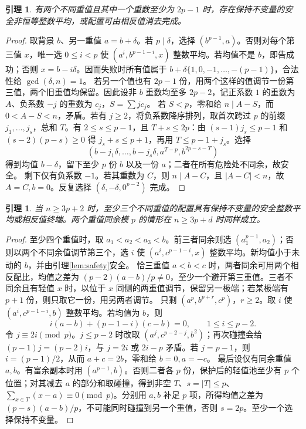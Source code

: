 \documentclass[11pt,a4paper]{article}
\newtheorem{lemma}[theorem]{引理}
\theoremstyle{definition}
\numberwithin{equation}{section}
\begin{document}
\begin{lemma}\label{lem:background}
有两个不同重值且其中一个重数至少为 $2p-1$ 时，存在保持不变量的安全非恒等整数平均，或配置可由相反值消去完成。
\end{lemma}
\begin{proof}
取背景 $b$、另一重值 $a=b+\delta$。若 $p\mid\delta$，选择 $(b^{p-1},a)$。否则对每个第三值 $x$，唯一选 $0\le i<p$ 使 $(a^i,b^{p-1-i},x)$ 整数平均。若均值不是 $b$，即告成功；否则 $x=b-i\delta$。因而失败时所有值属于 $b+\delta\{1,0,-1,\ldots,-(p-1)\}$，合法性给 $\gcd(\delta,n)=1$。
若另一个值也有 $2p-1$ 份，用两个这样的值调节一份第三值，两个旧重值均保留。因此设非 $b$ 重数均至多 $2p-2$，记正系数 $1$ 的重数为 $A$、负系数 $-j$ 的重数为 $c_j$，$S=\sum j c_j$。
若 $S<p$，零和给 $n\mid A-S$，而 $0<A-S<n$，矛盾。若有 $j\ge2$，将负系数降序排列，取首次跨过 $p$ 的前缀 $j_1,\ldots,j_s$，总和 $T$。有 $2\le s\le p-1$，且 $T+s\le2p$：由 $(s-1)j_s\le p-1$ 和 $(s-2)(p-s)\ge0$ 得 $j_s+s\le p+1$，再用 $T\le p-1+j_s$。选择
\[(b-j_1\delta,\ldots,b-j_s\delta,a^{T-p},b^{2p-s-T})
\]
得到均值 $b-\delta$，留下至少 $p$ 份 $b$ 以及一份 $a$；二者在所有危险处不同余，故安全。
剩下仅有负系数 $-1$。若其重数为 $C$，则 $n\mid A-C$，且 $|A-C|<n$，故 $A=C,b=0$。反复选择 $(\delta,-\delta,0^{p-2})$ 完成。
\end{proof}

\begin{lemma}\label{lem:heavy}
当 $n\ge3p+2$ 时，至少三个不同重值的配置具有保持不变量的安全整数平均或相反值终端。两个重值同余模 $p$ 的情形在 $n\ge3p+d$ 时同样成立。
\end{lemma}
\begin{proof}
至少四个重值时，取 $a_1<a_2<a_3<b$。前三者同余则选 $(a_1^{p-1},a_2)$；否则以两个不同余值调节第三个，选 $i$ 使 $(a^i,c^{p-1-i},x)$ 整数平均。新均值小于未动的 $b$，并由引理\ref{lem:safety}安全。
恰三重值 $a<b<c$ 时，两者同余可用两个相反配比，均值之差为 $(p-2)(a-b)/p\ne0$，至少一个避开第三重值。三者不同余且有轻值 $x$ 时，以位于 $x$ 同侧的两重值调节，保留另一极端；若某极端有 $p+1$ 份，则只取它一份，用另两者调节。
只剩 $(a^p,b^{p+r},c^p)$，$r\ge2$。取 $i$ 使 $(a^i,c^{p-1-i},b)$ 整数平均。若均值为 $b$，则
\[i(a-b)+(p-1-i)(c-b)=0,\qquad1\le i\le p-2.
\]
令 $j\equiv2i\pmod p$。$j\le p-2$ 时改取 $(a^j,c^{p-2-j},b^2)$；再次碰撞会给 $(p-1)j=(p-2)i$，与 $j=2i$ 或 $2i-p$ 矛盾。若 $j=p-1$，则 $i=(p-1)/2$，从而 $a+c=2b$，零和给 $b=0,a=-c$。
最后设仅有同余重值 $a,b$。有富余副本时用 $(a^{p-1},b)$。否则二者各 $p$ 份，保护后的轻值池至少有 $p$ 个位置；对其减去 $a$ 的部分和取碰撞，得到非空 $T$、$s=|T|\le p$、$\sum_{x\in T}(x-a)\equiv0\pmod p$。分别用 $a,b$ 补足 $p$ 项，所得均值之差为 $(p-s)(a-b)/p$，不可能同时碰撞到另一个重值，否则 $s=2p$。至少一个选择保持不变量。
\end{proof}
\end{document}
